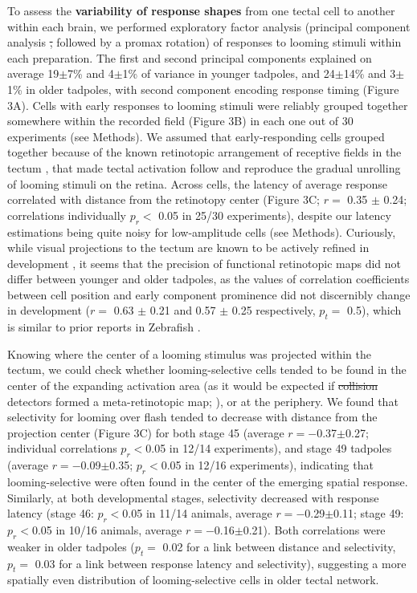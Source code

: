 \documentclass{article}
\providecommand{\DIFaddtex}[1]{{\protect\color{blue}{#1}}} %
\providecommand{\DIFdeltex}[1]{{\protect\color{red}\sout{#1}}}                      %
\providecommand{\DIFaddbegin}{} %
\providecommand{\DIFaddend}{} %
\providecommand{\DIFdelbegin}{} %
\providecommand{\DIFdelend}{} %
\providecommand{\DIFadd}[1]{\texorpdfstring{\DIFaddtex{#1}}{#1}} %
\providecommand{\DIFdel}[1]{\texorpdfstring{\DIFdeltex{#1}}{}} %
\newcommand{\DIFscaledelfig}{0.5}
\newlength{\DIFdelgraphicswidth} %
\newlength{\DIFdelgraphicsheight} %
\newcommand{\DIFaddincludegraphics}[2][]{{\color{blue}\fbox{\DIFOincludegraphics[#1]{#2}}}} %
\newcommand{\DIFdelincludegraphics}[2][]{%
\sbox{\DIFdelgraphicsbox}{\DIFOincludegraphics[#1]{#2}}%
\settoboxwidth{\DIFdelgraphicswidth}{\DIFdelgraphicsbox} %
\settoboxtotalheight{\DIFdelgraphicsheight}{\DIFdelgraphicsbox} %
\scalebox{\DIFscaledelfig}{%
\parbox[b]{\DIFdelgraphicswidth}{\usebox{\DIFdelgraphicsbox}\\[-\baselineskip] \rule{\DIFdelgraphicswidth}{0em}}\llap{\resizebox{\DIFdelgraphicswidth}{\DIFdelgraphicsheight}{%
\setlength{\unitlength}{\DIFdelgraphicswidth}%
\begin{picture}(1,1)%
\thicklines\linethickness{2pt} %
{\color[rgb]{1,0,0}\put(0,0){\framebox(1,1){}}}%
{\color[rgb]{1,0,0}\put(0,0){\line( 1,1){1}}}%
{\color[rgb]{1,0,0}\put(0,1){\line(1,-1){1}}}%
\end{picture}%
}\hspace*{3pt}}} %
} %
\DeclareRobustCommand{\DIFaddbegin}{\DIFOaddbegin \let\includegraphics\DIFaddincludegraphics} %
\DeclareRobustCommand{\DIFaddend}{\DIFOaddend \let\includegraphics\DIFOincludegraphics} %
\DeclareRobustCommand{\DIFdelbegin}{\DIFOdelbegin \let\includegraphics\DIFdelincludegraphics} %
\DeclareRobustCommand{\DIFdelend}{\DIFOaddend \let\includegraphics\DIFOincludegraphics} %
\begin{document}
To assess the \textbf{variability of response shapes} from one tectal cell to another within each brain, we performed exploratory factor analysis (principal component analysis \DIFdelbegin \DIFdel{, }\DIFdelend followed by a promax rotation) of responses to looming stimuli within each preparation. The first and second principal components explained on average 19$\pm$7\% and 4$\pm$1\% of variance in younger tadpoles, and 24$\pm$14\% and 3$\pm$1\% in older tadpoles, with second component encoding response timing (Figure 3A). Cells with early responses to looming stimuli were reliably grouped together somewhere within the recorded field (Figure 3B) in each one out of 30 experiments (see Methods). We assumed that early-responding cells grouped together because of the known retinotopic arrangement of receptive fields in the tectum \citep{ruthazer2004map}, that made tectal activation follow and reproduce the gradual unrolling of looming stimuli on the retina. Across cells, the latency of average response correlated with distance from the retinotopy center (Figure 3C; $r=$ 0.35 $\pm$ 0.24; correlations individually $p_r<$ 0.05 in 25/30 experiments), despite our latency estimations being quite noisy for low-amplitude cells (see Methods). Curiously, while visual projections to the tectum are known to be actively refined in development \citep{sakaguchi1985refinement, ruthazer2004map, munz2014hebbian}, it seems that the precision of functional retinotopic maps did not differ between younger and older tadpoles, as the values of correlation coefficients between cell position and early component prominence did not discernibly change in development ($r=$ 0.63 $\pm$ 0.21 and 0.57 $\pm$ 0.25 respectively, $p_t=$ 0.5), which is similar to prior reports in Zebrafish \citep{avitan2016limitations}.

Knowing where the center of a looming stimulus was projected within the tectum, we could check whether looming-selective cells tended to be found in the center of the expanding activation area (as it would be expected if \DIFdelbegin \DIFdel{collision }\DIFdelend \DIFaddbegin \DIFadd{looming }\DIFaddend detectors formed a meta-retinotopic map; \citealt{frost2004review}), or at the periphery. We found that selectivity for looming over flash tended to decrease with distance from the projection center (Figure 3C) for both stage 45 (average $r=-$0.37$\pm$0.27; individual correlations $p_r<$0.05 in 12/14 experiments), and stage 49 tadpoles (average $r=-$0.09$\pm$0.35; $p_r<$0.05 in 12/16 experiments), indicating that looming-selective were often found in the center of the emerging spatial response. Similarly, at both developmental stages, selectivity decreased with response latency (stage 46: $p_r<$0.05 in 11/14 animals, average $r=-$0.29$\pm$0.11; stage 49: $p_r<$0.05 in 10/16 animals, average $r=-$0.16$\pm$0.21). Both correlations were weaker in older tadpoles ($p_t=$ 0.02 for a link between distance and selectivity, $p_t=$ 0.03 for a link between response latency and selectivity), suggesting a more spatially even distribution of looming-selective cells in older tectal network.
\end{document}
